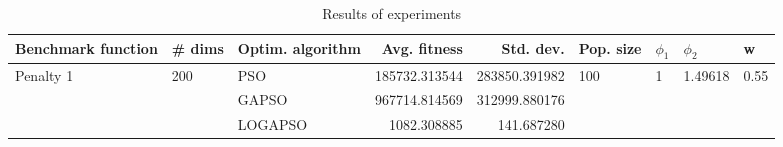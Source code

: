 \begin{table}
\centering
\caption{Results of experiments}
\begin{tabular}{lllrrllll}
\toprule
        Benchmark function &              \# dims & Optim. algorithm &  Avg. fitness &     Std. dev. &            Pop. size &         $\phi_{1}$ &               $\phi_{2}$ &                     w \\
\midrule
\multirow{3}{*}{Penalty 1} & \multirow{3}{*}{200} &              PSO & 185732.313544 & 283850.391982 & \multirow{3}{*}{100} & \multirow{3}{*}{1} & \multirow{3}{*}{1.49618} & \multirow{3}{*}{0.55} \\
                           &                      &            GAPSO & 967714.814569 & 312999.880176 &                      &                    &                          &                       \\
                           &                      &          LOGAPSO &   1082.308885 &    141.687280 &                      &                    &                          &                       \\
\bottomrule
\end{tabular}
\end{table}
